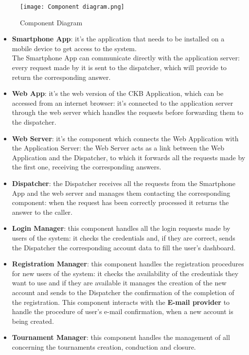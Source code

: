 \documentclass{article}
\begin{document}
\begin{figure}[H]
    \centering
    \texttt{[image: Component diagram.png]}
    \caption{Component Diagram}
\end{figure}
\begin{itemize}
    \item \textbf{Smartphone App}: it's the application that needs to be installed on a mobile device to 
    get access to the system.\\
    The Smartphone App can communicate directly with the application server: every request made by it is sent to the dispatcher, which will provide to return the corresponding answer.
    \item \textbf{Web App}: it's the web version of the CKB Application, which can be accessed from an internet browser: it's connected to the application server through the web server which handles the requests before forwarding them to the dispatcher.
    \item \textbf{Web Server}: it's the component which connects the Web Application with the Application Server: the Web Server acts as a link between the Web Application and the Dispatcher, to which it forwards all the requests made by the first one, receiving the corresponding answers. 
    \item \textbf{Dispatcher}: the Dispatcher receives all the requests from the Smartphone App and the web server and manages them contacting the corresponding component: when the request has been correctly processed it returns the answer to the caller.
    \item \textbf{Login Manager}: this component handles all the login requests made by users of the system: it checks the credentials and, if they are correct, sends the Dispatcher the corresponding account data to fill the user's dashboard.
    \item \textbf{Registration Manager}: this component handles the registration procedures for new users of the system: it checks the availability of the credentials they want to use and if they are available it manages the creation of the new account and sends to the Dispatcher the confirmation of the completion of the registration.
    This component interacts with the \textbf{E-mail provider} to handle the procedure of user's e-mail confirmation, when a new account is being created.
    \item \textbf{Tournament Manager}: this component handles the management of all concerning the tournaments creation, conduction and closure.\\

\end{itemize}
\end{document}

